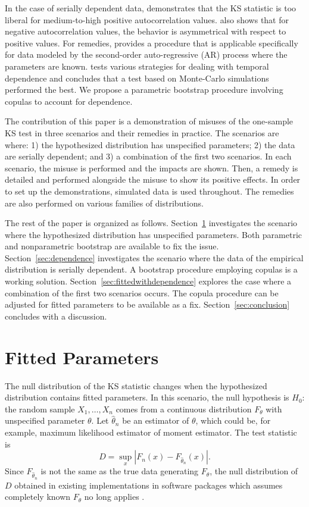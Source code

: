 \documentclass[12pt, letterpaper, titlepage]{article}
\begin{document}
In the case of serially dependent data, \citet{Durilleul} demonstrates that the 
KS statistic is too liberal for medium-to-high positive autocorrelation values. 
\citet{Durilleul} also shows that for negative autocorrelation values, the 
behavior is asymmetrical with respect to positive values. For remedies, 
\citet{Weiss} provides a procedure that is applicable specifically for data 
modeled by the second-order auto-regressive (AR) process where the parameters 
are known. \citet{Lanzante} tests various strategies for dealing with temporal 
dependence and concludes that a test based on Monte-Carlo simulations performed 
the best. We propose a parametric bootstrap procedure involving copulas to 
account for dependence.

The contribution of this paper is a demonstration of misuses of the one-sample
KS test in three scenarios and their remedies in practice. The scenarios are 
where:
1) the hypothesized distribution has unspecified parameters;
2) the data are serially dependent; and
3) a combination of the first two scenarios. 
In each scenario, the misuse is performed and the impacts are shown. Then, a
remedy is detailed and performed alongside the misuse to show its positive 
effects. In order to set up the demonstrations, simulated data is used 
throughout. The remedies are also performed on various families of 
distributions.

The rest of the paper is organized as follows. Section~\ref{sec:fitted}
investigates the scenario where the hypothesized distribution has unspecified
parameters. Both parametric and nonparametric bootstrap are available to fix the
issue. Section~\ref{sec:dependence} investigates the scenario where the data of 
the empirical distribution is serially dependent. A bootstrap procedure 
employing copulas is a working solution. Section~\ref{sec:fittedwithdependence}
explores the case where a combination of the first two scenarios occurs. The 
copula procedure can be adjusted for fitted parameters to be available as a fix. 
Section~\ref{sec:conclusion} concludes with a discussion.

\section{Fitted Parameters}
\label{sec:fitted}

The null distribution of the KS statistic changes when the hypothesized
distribution contains fitted parameters. In this scenario, the null hypothesis
is $H_0$: the random sample $X_1, \ldots, X_n$ comes from a continuous
distribution $F_{\theta}$ with unspecified parameter $\theta$.
Let $\hat\theta_n$ be an estimator of $\theta$, which could be, for example,
maximum likelihood estimator of moment estimator. The test statistic is
\begin{equation}
  \label{eq:ks_fitted}
  D = \sup_x | F_n(x) - F_{\hat\theta_n}(x) |.
\end{equation}
Since $F_{\hat\theta_n}$ is not the same as the true data generating
$F_\theta$, the null distribution of $D$ obtained in existing implementations in
software packages which assumes completely known $F_\theta$ no long applies
\citep{Steinskog}.
\end{document}
